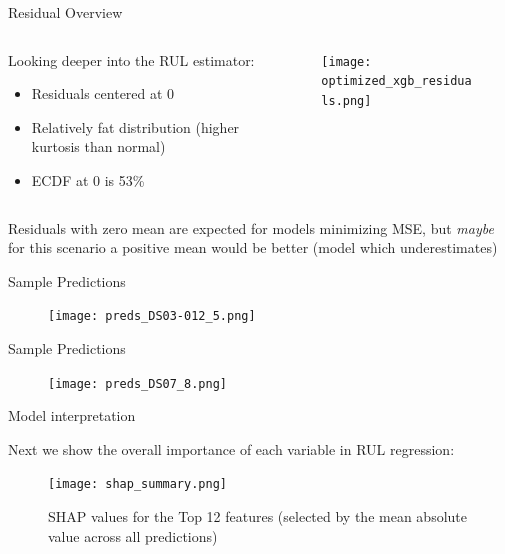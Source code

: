 \documentclass{beamer}
\begin{document}
        \begin{frame}{Residual Overview}
            \begin{columns}
                \begin{column}{0.45\textwidth}
                    Looking deeper into the RUL estimator:
                    \begin{itemize}
                        \item Residuals centered at 0
                        \item Relatively fat distribution (higher kurtosis than normal)
                        \item ECDF at 0 is 53\%
                    \end{itemize}
                \end{column}
                \begin{column}{0.55\textwidth}
                    \begin{figure}
                        \centering
                        \texttt{[image: optimized\_xgb\_residuals.png]}
                    \end{figure}
                \end{column}
            \end{columns}

            Residuals with zero mean are expected for models minimizing MSE, but \textit{maybe} for this scenario a positive mean would be better (model which underestimates)
        \end{frame}

        \begin{frame}{Sample Predictions}
            \begin{figure}[!htbp]
                \centering
                \texttt{[image: preds\_DS03-012\_5.png]}
            \end{figure}
        \end{frame}

        \begin{frame}{Sample Predictions}
            \begin{figure}[!htbp]
                \centering
                \texttt{[image: preds\_DS07\_8.png]}
            \end{figure}
        \end{frame}

        \begin{frame}{Model interpretation}

            Next we show the overall importance of each variable in RUL regression:
            \begin{figure}
                \centering
                \texttt{[image: shap\_summary.png]}
                \caption{SHAP values for the Top 12 features (selected by the mean absolute value across all predictions)}
            \end{figure}
        \end{frame}
\end{document}
